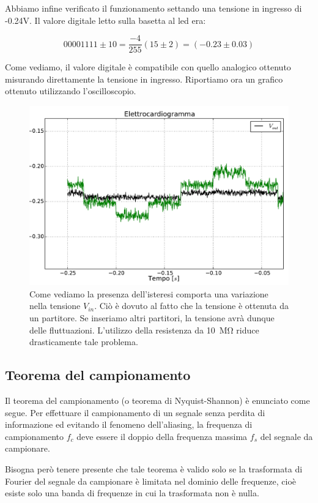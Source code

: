 Abbiamo infine verificato il funzionamento settando una tensione in ingresso di -0.24V. Il valore digitale letto sulla basetta al led era:

$$00001111\pm10=\frac{-4}{255}(15\pm2)=(-0.23\pm0.03)$$

Come vediamo, il valore digitale è compatibile con quello analogico ottenuto misurando direttamente la tensione in ingresso. Riportiamo ora un grafico ottenuto utilizzando l'oscilloscopio. 

\begin{figure}[htpc]
\centering
	\includegraphics[width=.73\textwidth]{../E13/latex/zoom.pdf}
	\caption{Come vediamo la presenza dell'isteresi comporta una variazione nella tensione $V_{in}$. Ciò è dovuto al fatto che la tensione è ottenuta da un partitore. Se inseriamo altri partitori, la tensione avrà dunque delle fluttuazioni. L'utilizzo della resistenza da \SI{10}{\mega\ohm} riduce drasticamente tale problema.}
	\label{graf:zoom}
\end{figure}

\subsection{Teorema del campionamento}

Il teorema del campionamento (o teorema di Nyquist-Shannon) è enunciato come segue. Per effettuare il campionamento di un segnale senza perdita di informazione ed evitando il fenomeno dell'aliasing, la frequenza di campionamento $f_c$ deve essere il doppio della frequenza massima $f_s$ del segnale da campionare.

Bisogna però tenere presente che tale teorema è valido solo se la trasformata di Fourier del segnale da campionare è limitata nel dominio delle frequenze, cioè esiste solo una banda di frequenze in cui la trasformata non è nulla.


